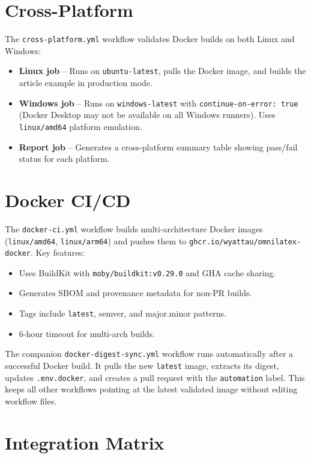 \section{Cross-Platform}

The \texttt{cross-platform.yml} workflow validates Docker builds on both
Linux and Windows:

\begin{itemize}
  \item \textbf{Linux job} -- Runs on \texttt{ubuntu-latest}, pulls the
        Docker image, and builds the article example in production mode.
  \item \textbf{Windows job} -- Runs on \texttt{windows-latest} with
        \texttt{continue-on-error: true} (Docker Desktop may not be
        available on all Windows runners).  Uses \texttt{linux/amd64}
        platform emulation.
  \item \textbf{Report job} -- Generates a cross-platform summary table
        showing pass/fail status for each platform.
\end{itemize}

\section{Docker CI/CD}

The \texttt{docker-ci.yml} workflow builds multi-architecture Docker images
(\texttt{linux/amd64}, \texttt{linux/arm64}) and pushes them to
\texttt{ghcr.io/wyattau/omnilatex-docker}.  Key features:

\begin{itemize}
  \item Uses BuildKit with \texttt{moby/buildkit:v0.29.0} and GHA cache
        sharing.
  \item Generates SBOM and provenance metadata for non-PR builds.
  \item Tags include \texttt{latest}, semver, and major.minor patterns.
  \item 6-hour timeout for multi-arch builds.
\end{itemize}

The companion \texttt{docker-digest-sync.yml} workflow runs automatically
after a successful Docker build.  It pulls the new \texttt{latest} image,
extracts its digest, updates \texttt{.env.docker}, and creates a pull
request with the \texttt{automation} label.  This keeps all other
workflows pointing at the latest validated image without editing workflow
files.

\section{Integration Matrix}

